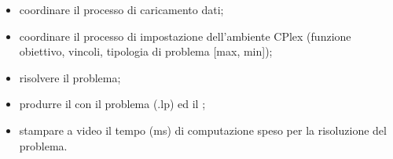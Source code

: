\begin{itemize}
\item coordinare il processo di caricamento dati;
\item coordinare il processo di impostazione dell'ambiente CPlex (funzione obiettivo, vincoli, tipologia di problema [max, min]);
\item risolvere il problema;
\item produrre il  con il problema (.lp) ed il ;
\item stampare a video il tempo (ms) di computazione speso per la risoluzione del problema.
\end{itemize}
